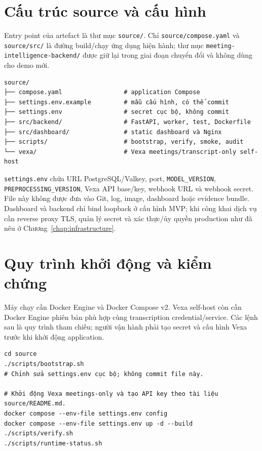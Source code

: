 \section{Cấu trúc source và cấu hình}
Entry point của artefact là thư mục \texttt{source/}. Chỉ \texttt{source/compose.yaml} và \texttt{source/src/} là đường build/chạy ứng dụng hiện hành; thư mục \texttt{meeting-intelligence-backend/} được giữ lại trong giai đoạn chuyển đổi và không dùng cho demo mới.

\begin{lstlisting}[style=bashstyle, caption={Cấu trúc rút gọn của artefact}]
source/
├── compose.yaml                 # application Compose
├── settings.env.example         # mẫu cấu hình, có thể commit
├── settings.env                 # secret cục bộ, không commit
├── src/backend/                 # FastAPI, worker, test, Dockerfile
├── src/dashboard/               # static dashboard và Nginx
├── scripts/                     # bootstrap, verify, smoke, audit
└── vexa/                        # Vexa meetings/transcript-only self-host
\end{lstlisting}

\texttt{settings.env} chứa URL PostgreSQL/Valkey, port, \texttt{MODEL\_VERSION}, \texttt{PREPROCESSING\_VERSION}, Vexa API base/key, webhook URL và webhook secret. File này không được đưa vào Git, log, image, dashboard hoặc evidence bundle. Dashboard và backend chỉ bind loopback ở cấu hình MVP; khi công khai dịch vụ cần reverse proxy TLS, quản lý secret và xác thực/ủy quyền production như đã nêu ở Chương~\ref{chap:infrastructure}.

\section{Quy trình khởi động và kiểm chứng}
Máy chạy cần Docker Engine và Docker Compose v2. Vexa self-host còn cần Docker Engine phiên bản phù hợp cùng transcription credential/service. Các lệnh sau là quy trình tham chiếu; người vận hành phải tạo secret và cấu hình Vexa trước khi khởi động application.

\begin{lstlisting}[style=bashstyle, caption={Khởi động application và kiểm tra reachability}]
cd source
./scripts/bootstrap.sh
# Chỉnh sửa settings.env cục bộ; không commit file này.

# Khởi động Vexa meetings-only và tạo API key theo tài liệu source/README.md.
docker compose --env-file settings.env config
docker compose --env-file settings.env up -d --build
./scripts/verify.sh
./scripts/runtime-status.sh
\end{lstlisting}

